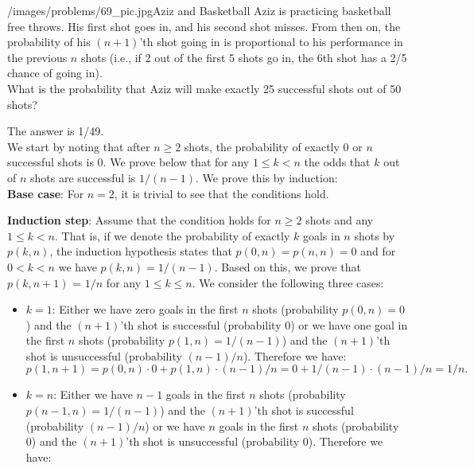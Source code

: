 \begin{problem}{/images/problems/69_pic.jpg}{Aziz and Basketball} Aziz is practicing basketball free throws. His first shot goes in, and his second shot misses. From then on, the probability of his $(n+1)$'th shot going in is proportional to his performance in the previous $n$ shots (i.e., if 2 out of the first 5 shots go in, the 6th shot has a 2/5 chance of going in).\\[0.2cm]
	
What is the probability that Aziz will make exactly 25 successful shots out of 50 shots?
\end{problem}

\begin{solution}
The answer is 1/49.\\[0.2cm]

We start by noting that after $n \geq 2$ shots, the probability of exactly 0 or $n$ successful shots is 0. We prove below that for any $1 \leq k < n$ the odds that $k$ out of $n$ shots are successful is $1/(n-1)$. We prove this by induction:\\[0.2cm]

\textbf{Base case}: For $n=2$, it is trivial to see that the conditions hold.

\textbf{Induction step}: Assume that the condition holds for $n \geq 2$ shots and any $1 \leq k < n$. That is, if we denote the probability of exactly $k$ goals in $n$ shots by $p(k, n)$, the induction hypothesis states that $p(0, n) = p(n, n) = 0$ and for $0 < k < n$ we have $p(k, n) = 1/(n-1)$. Based on this, we prove that $p(k,n+1)$ = $1/n$ for any $1 \leq k \leq n$. We consider the following three cases:

\begin{itemize}
\item $k=1$: Either we have zero goals in the first $n$ shots (probability $p(0,n) = 0$) and the $(n+1)$'th shot is successful (probability 0) or we have one goal in the first $n$ shots (probability $p(1,n) = 1/(n-1)$) and the $(n+1)$'th shot is unsuccessful (probability $(n-1)/n$). Therefore we have:
$$p(1, n+1) = p(0, n) \cdot 0 + p(1, n) \cdot (n-1)/n = 0 + 1/(n-1) \cdot (n-1)/n = 1/n.$$

\item $k=n$: Either we have $n-1$ goals in the first $n$ shots (probability $p(n-1,n) = 1/(n-1)$) and the $(n+1)$'th shot is successful (probability $(n-1)/n$) or we have $n$ goals in the first $n$ shots (probability 0) and the $(n+1)$'th shot is unsuccessful (probability 0). Therefore we have:


\end{itemize}
\end{solution}
